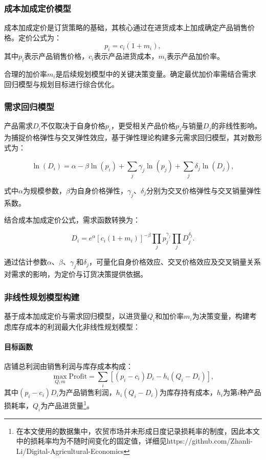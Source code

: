 \documentclass[lang=cn,12pt,a4paper]{elegantpaper}
\begin{document}
\subsubsection{成本加成定价模型}
\label{subsubsec:cost_plus_pricing}
成本加成定价是订货策略的基础，其核心通过在进货成本上加成确定产品销售价格。定价公式为：
\begin{equation}
p_i = c_i  (1 + m_i),
\end{equation}
其中$p_i$表示产品销售价格，$c_i$表示产品进货成本，$m_i$表示产品加价率。

合理的加价率$m_i$是后续规划模型中的关键决策变量。确定最优加价率需结合需求回归模型与规划目标进行综合优化。

\subsubsection{需求回归模型}
\label{subsubsec:demand_regression_model}
产品需求$D_i$不仅取决于自身价格$p_i$，更受相关产品价格$p_j$与销量$D_j$的非线性影响。为捕捉价格弹性与交叉弹性效应，基于弹性理论构建多元需求回归模型，其对数形式为：

\begin{equation}
\ln(D_i) = \alpha - \beta \ln(p_i) + \sum_j \gamma_j \ln(p_j) + \sum_j \delta_j \ln(D_j),
\end{equation}

式中$\alpha$为规模参数，$\beta$为自身价格弹性，$\gamma_j$、$\delta_j$分别为交叉价格弹性与交叉销量弹性系数。

结合成本加成定价公式，需求函数转换为：

\begin{equation}
D_i = e^{\alpha} [c_i(1 + m_i)]^{-\beta} \prod_j p_j^{\gamma_j} \prod_j D_j^{\delta_j}.
\end{equation}

通过估计参数$\alpha$、$\beta$、$\gamma_j$和$\delta_j$，可量化自身价格效应、交叉价格效应及交叉销量关系对需求的影响，为定价与订货决策提供依据。

\subsubsection{非线性规划模型构建}
\label{subsubsec:nonlinear_programming_model}
基于成本加成定价与需求回归模型，以进货量$Q_i$和加价率$m_i$为决策变量，构建考虑库存成本的利润最大化非线性规划模型：

\paragraph{目标函数}
店铺总利润由销售利润与库存成本构成：
\begin{equation}
\max_{Q, m} \text{Profit} = \sum_i [(p_i - c_i)  D_i - h_i  (Q_i - D_i)],
\end{equation}
其中$(p_i - c_i)  D_i$为产品销售利润，$h_i  (Q_i - D_i)$为库存持有成本，$h_i$为第$i$种产品损耗率，$Q_i$为产品进货量\footnote{在本文使用的数据集中，农贸市场并未形成日度记录损耗率的制度，因此本文中的损耗率均为不随时间变化的固定值，详细见https://github.com/Zhanli-Li/Digital-Agricultural-Economics}。
\end{document}
